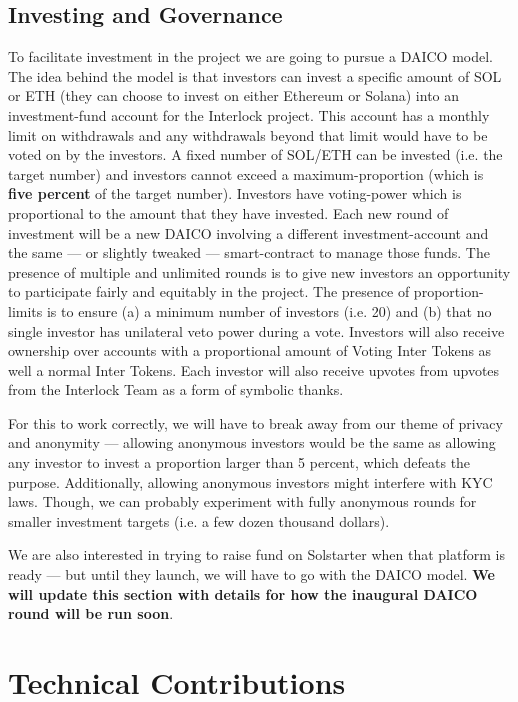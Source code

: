 \documentclass[a4paper]{article}
\begin{document}
\subsection{Investing and Governance}
\label{Investing and Governance}

To facilitate investment in the project we are going to pursue a DAICO model. The idea behind the model is that investors can invest a specific amount of SOL or ETH (they can choose to invest on either Ethereum or Solana) into an investment-fund account for the Interlock project. This account has a monthly limit on withdrawals and any withdrawals beyond that limit would have to be voted on by the investors. A fixed number of SOL/ETH can be invested (i.e. the target number) and investors cannot exceed a maximum-proportion (which is \textbf{five percent} of the target number). Investors have voting-power which is proportional to the amount that they have invested. Each new round of investment will be a new DAICO involving a different investment-account and the same ---  or slightly tweaked ---  smart-contract to manage those funds. The presence of multiple and unlimited rounds is to give new investors an opportunity to participate fairly and equitably in the project. The presence of proportion-limits is to ensure (a) a minimum number of investors (i.e. 20) and (b) that no single investor has unilateral veto power during a vote. Investors will also receive ownership over accounts with a proportional amount of Voting Inter Tokens as well a normal Inter Tokens. Each investor will also receive upvotes from upvotes from the Interlock Team as a form of symbolic thanks.

For this to work correctly, we will have to break away from our theme of privacy and anonymity ---  allowing anonymous investors would be the same as allowing any investor to invest a proportion larger than 5 percent, which defeats the purpose. Additionally, allowing anonymous investors might interfere with KYC laws. Though, we can probably experiment with fully anonymous rounds for smaller investment targets (i.e. a few dozen thousand dollars).

We are also interested in trying to raise fund on Solstarter when that platform is ready ---  but until they launch, we will have to go with the DAICO model. \textbf{We will update this section with details for how the inaugural DAICO round will be run soon}.
\section{Technical Contributions}
\label{Technical Contributions}
\end{document}

